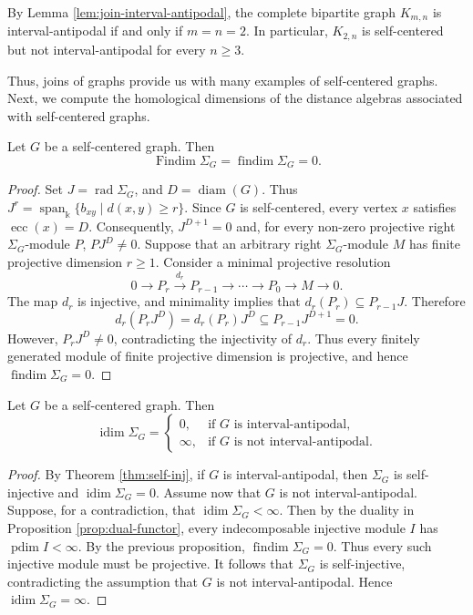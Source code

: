 \documentclass[a4paper,leqno]{amsart}
\begin{document}
\begin{eg}\label{eg:self-centered-revisited}
By Lemma \ref{lem:join-interval-antipodal}, the complete bipartite graph $K_{m,n}$ is interval-antipodal if and only if $m=n=2$. In particular, $K_{2,n}$ is self-centered but not interval-antipodal for every $n\geq3$.
\end{eg}

Thus, joins of graphs provide us with many examples of self-centered graphs. Next, we compute the homological dimensions of the distance algebras associated with self-centered graphs.

\begin{prop}
Let $G$ be a self-centered graph. Then
\[
\operatorname{Findim} \Sigma_G=\operatorname{findim} \Sigma_G=0.
\]
\end{prop}

\begin{proof}
Set $J=\operatorname{rad}\Sigma_G$, and $D=\operatorname{diam}(G)$.
Thus $J^r=\operatorname{span}_{\Bbbk}\{b_{xy}\mid d(x,y)\ge r\}$. Since $G$ is self-centered, every vertex $x$ satisfies $\operatorname{ecc}(x)=D$. Consequently, $J^{D+1}=0$ and, for every non-zero projective right $\Sigma_G$-module $P$, $PJ^D\neq 0$. Suppose that an arbitrary right $\Sigma_G$-module $M$ has finite projective dimension $r\geq 1$. Consider a minimal projective resolution
\[
0\longrightarrow P_r
 \xrightarrow{d_r}P_{r-1}
 \longrightarrow\cdots\longrightarrow P_0
 \longrightarrow M\longrightarrow 0.
\]
The map $d_r$ is injective, and minimality implies that $d_r(P_r)\subseteq P_{r-1}J$. Therefore
$$d_r(P_rJ^D)=d_r(P_r)J^D\subseteq P_{r-1}J^{D+1}=0.$$
However, $P_rJ^D\neq0$, contradicting the injectivity of $d_r$. Thus every finitely generated module of finite projective dimension is projective, and hence $\operatorname{findim}\Sigma_G=0$.
\end{proof}

\begin{prop}\label{prop:idim self-centered}
Let $G$ be a self-centered graph. Then
\[
\operatorname{idim} \Sigma_G=
\begin{cases}
0,      & \text{if $G$ is interval-antipodal},\\
\infty, & \text{if $G$ is not interval-antipodal}.
\end{cases}
\]
\end{prop}

\begin{proof}
By Theorem \ref{thm:self-inj}, if $G$ is interval-antipodal, then $\Sigma_G$ is self-injective and $\operatorname{idim}\Sigma_G=0$. 
Assume now that $G$ is not interval-antipodal. Suppose, for a  contradiction, that $\operatorname{idim}\Sigma_G<\infty$. Then by the duality in Proposition \ref{prop:dual-functor}, every indecomposable injective module $I$ has $\operatorname{pdim}I<\infty$. By the previous proposition, $\operatorname{findim}\Sigma_G=0$. Thus every such injective module must be projective. It follows that $\Sigma_G$ is
self-injective, contradicting the assumption that $G$ is not
interval-antipodal. Hence $\operatorname{idim}\Sigma_G=\infty$.
\end{proof}
\end{document}
